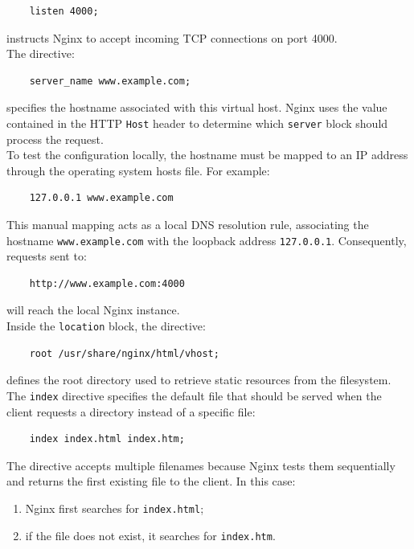 \documentclass{scrbook}
\begin{document}
	\begin{lstlisting}
	listen 4000;
	\end{lstlisting}
	
	instructs Nginx to accept incoming TCP connections on port 4000.\\
	
	The directive:
	
	\begin{verbatim}
	server_name www.example.com;
	\end{verbatim}
	
	specifies the hostname associated with this virtual host. Nginx uses the value contained in the HTTP \texttt{Host} header to determine which \texttt{server} block should process the request.\\
	
	To test the configuration locally, the hostname must be mapped to an IP address through the operating system hosts file. For example:
	
	\begin{verbatim}
	127.0.0.1 www.example.com
	\end{verbatim}
	
	This manual mapping acts as a local DNS resolution rule, associating the hostname \texttt{www.example.com} with the loopback address \texttt{127.0.0.1}. Consequently, requests sent to:
	
	\begin{verbatim}
	http://www.example.com:4000
	\end{verbatim}
	
	will reach the local Nginx instance.\\
	
	Inside the \texttt{location} block, the directive:
	
	\begin{verbatim}
	root /usr/share/nginx/html/vhost;
	\end{verbatim}
	
	defines the root directory used to retrieve static resources from the filesystem.\\
	
	The \texttt{index} directive specifies the default file that should be served when the client requests a directory instead of a specific file:
	
	\begin{verbatim}
	index index.html index.htm;
	\end{verbatim}
	
	The directive accepts multiple filenames because Nginx tests them sequentially and returns the first existing file to the client. In this case:
	\begin{enumerate}
		\item Nginx first searches for \texttt{index.html};
		\item if the file does not exist, it searches for \texttt{index.htm}.
	\end{enumerate}
	
\end{document}
